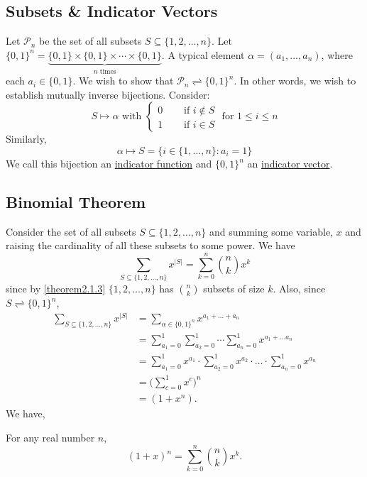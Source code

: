 \documentclass[11pt]{article}
\newcommand{\equicard}{\rightleftharpoons}
\begin{document}
\begin{titlepage}
\subsection{Subsets \& Indicator Vectors}
Let $\mathcal{P}_n$ be the set of all subsets $S \subseteq \{1,2,\dots, n\}$.
Let $\{0,1\}^n = \underbrace{\{0,1\} \times \{0,1\} \times \cdots \times
\{0,1\}}_{n \text{ times}}$. A typical element $\alpha = (a_1, \dots, a_n)$,
where each $a_i \in \{0,1\}$. We wish to show that $\mathcal{P}_n \equicard
\{0,1\}^n$. In other words, we wish to establish mutually inverse bijections.
Consider:
\begin{equation*}
	S \mapsto \alpha \text{ with }
	\begin{cases}
		0 &\quad \text{ if } i \notin S\\
		1 &\quad \text{ if } i \in S
	\end{cases}
	\text{  for } 1 \leq i \leq n
\end{equation*}
Similarly,
\begin{equation*}
	\alpha \mapsto S = \big\{ i \in \{1, \dots, n\}: a_i = 1\big\}
\end{equation*}
We call this bijection an \underline{indicator function} and $\{0,1\}^n$ an
\underline{indicator vector}.

\subsection{Binomial Theorem}
Consider the set of all subsets $S \subseteq \{1, 2, \dots, n\}$ and summing
some variable, $x$ and raising the cardinality of all these subsets to some
power. We have 
\begin{equation*}
	\sum_{S \subseteq \{ 1,2,\dots,n \}} x^{|S|} = \sum^n_{k=0}\binom{n}{k}x^k
\end{equation*}
since by \cref{theorem2.1.3} $\{1,2,\dots,n\}$ has $\binom{n}{k}$ subsets of
size $k$. Also, since $S \equicard \{0,1\}^n$,
\begin{align*}
	\sum_{S \subseteq \{ 1,2,\dots,n \}} x^{|S|} &= \sum_{\alpha \in \{0,1\}^n}
	x^{a_1 + \dots + a_n} \tag{by Cartisian Product}\\
	&= \sum_{a_1=0}^1 \sum_{a_2=0}^1 \cdots \sum_{a_n=0}^1 x^{a_1 + \dots
	a_n}\\
	&= \sum_{a_1=0}^1 x^{a_1} \cdot \sum_{a_2=0}^1 x^{a_2} \cdot \dots \cdot
	\sum_{a_n=0}^1 x^{a_n}\\
	&= \bigg( \sum^1_{c = 0} x^c \bigg)^n\\
	&= (1+x^n).
\end{align*}
We have,
\begin{prop}
	For any real number $n$,
	\begin{equation*}
		(1+x)^n = \sum_{k=0}^n \binom{n}{k}x^k.
	\end{equation*}
\end{prop}


\end{titlepage}
\end{document}
